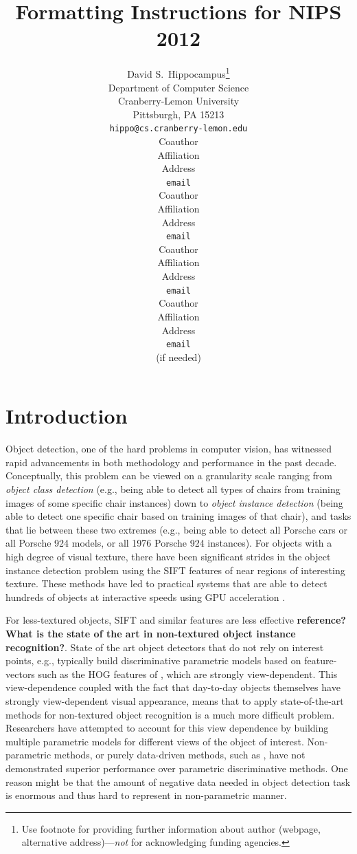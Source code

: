 \documentclass{article} %
\title{Formatting Instructions for NIPS 2012}
\author{
David S.~Hippocampus\thanks{ Use footnote for providing further information
about author (webpage, alternative address)---\emph{not} for acknowledging
funding agencies.} \\
Department of Computer Science\\
Cranberry-Lemon University\\
Pittsburgh, PA 15213 \\
\texttt{hippo@cs.cranberry-lemon.edu} \\
\And
Coauthor \\
Affiliation \\
Address \\
\texttt{email} \\
\AND
Coauthor \\
Affiliation \\
Address \\
\texttt{email} \\
\And
Coauthor \\
Affiliation \\
Address \\
\texttt{email} \\
\And
Coauthor \\
Affiliation \\
Address \\
\texttt{email} \\
(if needed)\\
}
\begin{document}
\maketitle

\begin{abstract}

\end{abstract}

\section{Introduction}
\label{approach}
Object detection, one of the hard problems in computer vision, has witnessed rapid advancements in both methodology and performance in the past decade. Conceptually, this problem can be viewed on a granularity scale ranging from {\em object class detection} (e.g., being able to detect all types of chairs from training images of some specific chair instances) down to {\em object instance detection} (being able to detect one specific chair based on training images of that chair), and tasks that lie between these two extremes (e.g., being able to detect all Porsche cars or all Porsche 924 models, or all 1976 Porsche 924 instances). For objects with a high degree of visual texture, there have been significant strides in the object instance detection problem using the SIFT features of \cite{Lowe2004} near regions of interesting texture. These methods have led to practical systems that are able to detect hundreds of objects at interactive speeds using GPU acceleration \cite{moped}. 

For less-textured objects, SIFT and similar features are less effective {\bf reference? What is the state of the art in non-textured object instance recognition?}. State of the art object detectors that do not rely on interest points, e.g., \cite{dalal2005histograms,felzenszwalb2008discriminatively,desai2009discriminative} typically build discriminative parametric models based on feature-vectors such as the  HOG features of \cite{dalal2005histograms}, which are strongly view-dependent. This view-dependence coupled with the fact that day-to-day objects themselves have strongly view-dependent visual appearance, means that to apply state-of-the-art methods for non-textured object recognition is a much more difficult problem. Researchers have attempted to account for this view dependence by building multiple parametric  models for different views of the object of interest. Non-parametric methods, or purely data-driven methods, such as \cite{russell2007object,malisiewicz2008recognition}, have not demonstrated superior performance over parametric discriminative methods. One reason might be that the amount of negative data needed in object detection task is enormous and thus hard to represent in non-parametric manner. 
\end{document}
